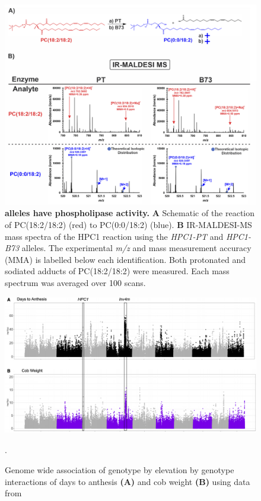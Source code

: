 \begin{subappendices}
\begin{figure}[t]
\begin{center}
\includegraphics[width=\linewidth]{Sup_Figures/Sup_Fig_8.png}
\caption[\hpc alleles have phospholipase activity.]
{\textbf{\hpc alleles have phospholipase activity.}
\textbf{A} Schematic of the \hpc reaction of PC(18:2/18:2) (red) to
PC(0:0/18:2) (blue). 
\textbf{B} IR-MALDESI-MS mass spectra of the HPC1 reaction using the \textit{HPC1-PT} and \textit{HPC1-B73} alleles. The
experimental \textit{m/z} and mass measurement accuracy (MMA) is labelled below each
identification. 
Both protonated and sodiated adducts of PC(18:2/18:2) were measured. 
Each mass spectrum was averaged over 100 scans.}
\label{figure:Sup:MS_spectra}
\end{center}
\end{figure} 
\clearpage

\begin{figure}[t]
\begin{center}
\includegraphics[width=0.8 \paperwidth]{Sup_Figures/Sup_Fig_9.png}
\caption[Genome wide association of genotype by elevation by genotype interactions of days to anthesis.]{Genome wide association of genotype by elevation by genotype interactions of days to anthesis \textbf{(A)} and cob weight \textbf{(B)} using data from \cite{gates2019-xu}}.
\label{figure:Sup:GxE_scan}
\end{center}
\end{figure} 
\clearpage


\end{subappendices}
